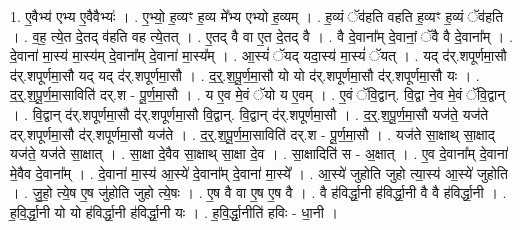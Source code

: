 \documentclass[17pt]{extarticle}
\begin{document}
1. ए॒वैभ्य॑ एभ्य ए॒वैवैभ्यः॑ । . ए॒भ्यो॒ ह॒व्यꣳ ह॒व्य मे᳚भ्य एभ्यो ह॒व्यम् । . ह॒व्यं ॅव॑हति वहति ह॒व्यꣳ ह॒व्यं ॅव॑हति । . व॒ह॒ त्ये॒त दे॒तद् व॑हति वह त्ये॒तत् । . ए॒तद् वै वा ए॒त दे॒तद् वै । . वै दे॒वाना᳚म् दे॒वानां॒ ॅवै वै दे॒वाना᳚म् । . दे॒वाना॑ मा॒स्य॑ मा॒स्य॑म् दे॒वाना᳚म् दे॒वाना॑ मा॒स्य᳚म् । . आ॒स्यं॑ ॅयद् यदा॒स्य॑ मा॒स्यं॑ ॅयत् । . यद् द॑र्.शपूर्णमा॒सौ द॑र्.शपूर्णमा॒सौ यद् यद् द॑र्.शपूर्णमा॒सौ । . द॒र्॒.श॒पू॒र्ण॒मा॒सौ यो यो द॑र्.शपूर्णमा॒सौ द॑र्.शपूर्णमा॒सौ यः । . द॒र्॒.श॒पू॒र्ण॒मा॒साविति॑ दर्.श - पू॒र्ण॒मा॒सौ । . य ए॒व मे॒वं ॅयो य ए॒वम् । . ए॒वं ॅवि॒द्वान्. वि॒द्वा ने॒व मे॒वं ॅवि॒द्वान् । . वि॒द्वान् द॑र्.शपूर्णमा॒सौ द॑र्.शपूर्णमा॒सौ वि॒द्वान्. वि॒द्वान् द॑र्.शपूर्णमा॒सौ । . द॒र्॒.श॒पू॒र्ण॒मा॒सौ यज॑ते॒ यज॑ते दर्.शपूर्णमा॒सौ द॑र्.शपूर्णमा॒सौ यज॑ते । . द॒र्॒.श॒पू॒र्ण॒मा॒साविति॑ दर्.श - पू॒र्ण॒मा॒सौ । . यज॑ते सा॒क्षाथ् सा॒क्षाद् यज॑ते॒ यज॑ते सा॒क्षात् । . सा॒क्षा दे॒वैव सा॒क्षाथ् सा॒क्षा दे॒व । . सा॒क्षादिति॑ स - अ॒क्षात् । . ए॒व दे॒वाना᳚म् दे॒वाना॑ मे॒वैव दे॒वाना᳚म् । . दे॒वाना॑ मा॒स्य॑ आ॒स्ये॑ दे॒वाना᳚म् दे॒वाना॑ मा॒स्ये᳚ । . आ॒स्ये॑ जुहोति जुहो त्या॒स्य॑ आ॒स्ये॑ जुहोति । . जु॒हो॒ त्ये॒ष ए॒ष जु॑होति जुहो त्ये॒षः । . ए॒ष वै वा ए॒ष ए॒ष वै । . वै ह॑विर्द्धा॒नी ह॑विर्द्धा॒नी वै वै ह॑विर्द्धा॒नी । . ह॒वि॒र्द्धा॒नी यो यो ह॑विर्द्धा॒नी ह॑विर्द्धा॒नी यः । . ह॒वि॒र्द्धा॒नीति॑ हविः - धा॒नी । \newline
\end{document}
